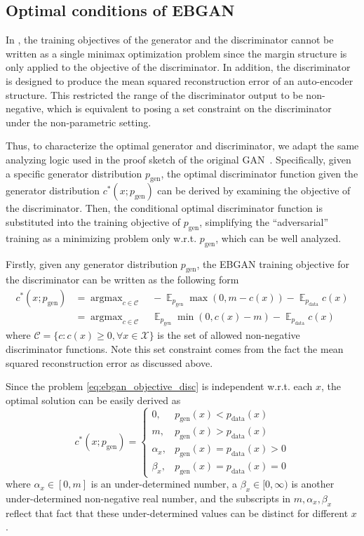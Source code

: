 \documentclass[a4paper]{article}
\newcommand{\pd}{p_\text{data}}
\newcommand{\pg}{p_\text{gen}}
\DeclareMathOperator*{\E}{\mathbb{E}}
\DeclareMathOperator*{\argmax}{\arg\max}
\begin{document}
\subsection{Optimal conditions of EBGAN}
\label{sec:ebgan_proof}

In \citep{zhao2016energy}, the training objectives of the generator and the discriminator cannot be written as a single minimax optimization problem since the margin structure is only applied to the objective of the discriminator.
In addition, the discriminator is designed to produce the mean squared reconstruction error of an auto-encoder structure.
This restricted the range of the discriminator output to be non-negative, which is equivalent to posing a set constraint on the discriminator under the non-parametric setting.

Thus, to characterize the optimal generator and discriminator, we adapt the same analyzing logic used in the proof sketch of the original GAN~\citep{goodfellow2014generative}.
Specifically, given a specific generator distribution $\pg$, the optimal discriminator function given the generator distribution $c^*(x; \pg)$ can be derived by examining the objective of the discriminator.
Then, the conditional optimal discriminator function is substituted into the training objective of $\pg$, simplifying the ``adversarial'' training as a minimizing problem only w.r.t. $\pg$, which can be well analyzed.

Firstly, given any generator distribution $\pg$, the EBGAN training objective for the discriminator can be written as the following form
\begin{equation}
\label{eq:ebgan_objective_disc}
\begin{aligned}
c^*(x; \pg) 
&= \argmax_{c \in \mathcal{C}} \quad -\E_{\pg}\max(0, m - c(x)) - \E_{\pd} c(x) \\
&= \argmax_{c \in \mathcal{C}} \quad \E_{\pg}\min(0, c(x) - m) - \E_{\pd} c(x)
\end{aligned}
\end{equation}
where $\mathcal{C} = \{c: c(x) \geq 0, \forall x \in \mathcal{X}\}$ is the set of allowed non-negative discriminator functions.
Note this set constraint comes from the fact the mean squared reconstruction error as discussed above.

Since the problem \eqref{eq:ebgan_objective_disc} is independent w.r.t. each $x$, the optimal solution can be easily derived as
\begin{equation}
\label{eq:ebgan_optimal_c}
c^*(x; \pg) =
\begin{cases}
0,& \pg(x) < \pd(x) \\
m,& \pg(x) > \pd(x) \\
\alpha_x, & \pg(x) = \pd(x) > 0 \\
\beta_x, & \pg(x) = \pd(x) = 0
\end{cases}
\end{equation}
where $\alpha_x \in [0, m]$ is an under-determined number, a $\beta_x \in [0, \infty)$ is another under-determined non-negative real number, and the subscripts in $m, \alpha_x, \beta_x$ reflect that fact that these under-determined values can be distinct for different $x$.
\end{document}
